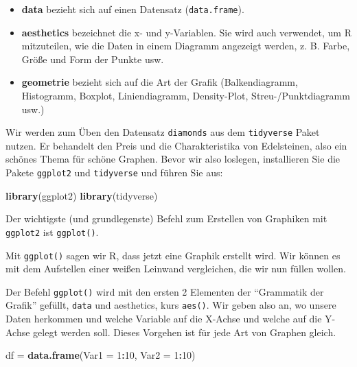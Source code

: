 \documentclass[
]{book}
\newenvironment{Shaded}{\begin{snugshade}}{\end{snugshade}}
\newcommand{\AttributeTok}[1]{\textcolor[rgb]{0.13,0.29,0.53}{#1}}
\newcommand{\DecValTok}[1]{\textcolor[rgb]{0.00,0.00,0.81}{#1}}
\newcommand{\FunctionTok}[1]{\textcolor[rgb]{0.13,0.29,0.53}{\textbf{#1}}}
\newcommand{\NormalTok}[1]{#1}
\newcommand{\OtherTok}[1]{\textcolor[rgb]{0.56,0.35,0.01}{#1}}
\newcommand{\SpecialCharTok}[1]{\textcolor[rgb]{0.81,0.36,0.00}{\textbf{#1}}}
\begin{document}
\begin{itemize}
\item
  \textbf{data} bezieht sich auf einen Datensatz (\texttt{data.frame}).
\item
  \textbf{aesthetics} bezeichnet die x- und y-Variablen. Sie wird auch verwendet, um R mitzuteilen, wie die Daten in einem Diagramm angezeigt werden, z. B. Farbe, Größe und Form der Punkte usw.
\item
  \textbf{geometrie} bezieht sich auf die Art der Grafik (Balkendiagramm, Histogramm, Boxplot, Liniendiagramm, Density-Plot, Streu-/Punktdiagramm usw.)
\end{itemize}

Wir werden zum Üben den Datensatz \texttt{diamonds} aus dem \texttt{tidyverse} Paket nutzen. Er behandelt den Preis und die Charakteristika von Edelsteinen, also ein schönes Thema für schöne Graphen. Bevor wir also loslegen, installieren Sie die Pakete \texttt{ggplot2} und \texttt{tidyverse} und führen Sie aus:

\begin{Shaded}
\begin{Highlighting}[]
\FunctionTok{library}\NormalTok{(ggplot2)}
\FunctionTok{library}\NormalTok{(tidyverse)}
\end{Highlighting}
\end{Shaded}

Der wichtigste (und grundlegenste) Befehl zum Erstellen von Graphiken mit \texttt{ggplot2} ist \texttt{ggplot()}.

Mit \texttt{ggplot()} sagen wir R, dass jetzt eine Graphik erstellt wird. Wir können es mit dem Aufstellen einer weißen Leinwand vergleichen, die wir nun füllen wollen.

Der Befehl \texttt{ggplot()} wird mit den ersten 2 Elementen der ``Grammatik der Grafik'' gefüllt, \texttt{data} und aesthetics, kurs \texttt{aes()}. Wir geben also an, wo unsere Daten herkommen und welche Variable auf die X-Achse und welche auf die Y-Achse gelegt werden soll. Dieses Vorgehen ist für jede Art von Graphen gleich.

\begin{Shaded}
\begin{Highlighting}[]
\NormalTok{df }\OtherTok{=} \FunctionTok{data.frame}\NormalTok{(}\AttributeTok{Var1 =} \DecValTok{1}\SpecialCharTok{:}\DecValTok{10}\NormalTok{,}
                \AttributeTok{Var2 =} \DecValTok{1}\SpecialCharTok{:}\DecValTok{10}\NormalTok{)}
\end{Highlighting}
\end{Shaded}
\end{document}
